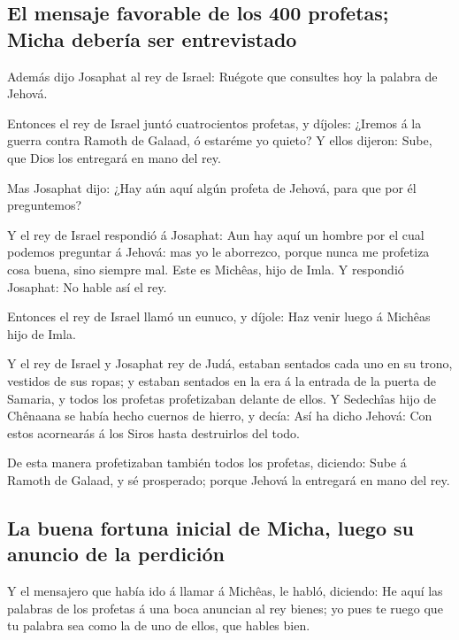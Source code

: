 \hypertarget{el-mensaje-favorable-de-los-400-profetas-micha-deberuxeda-ser-entrevistado}{%
\subsection{El mensaje favorable de los 400 profetas; Micha debería ser
entrevistado}\label{el-mensaje-favorable-de-los-400-profetas-micha-deberuxeda-ser-entrevistado}}

 Además dijo Josaphat al rey de Israel: Ruégote que
consultes hoy la palabra de Jehová.

 Entonces el rey de Israel juntó cuatrocientos profetas, y
díjoles: ¿Iremos á la guerra contra Ramoth de Galaad, ó estaréme yo
quieto? Y ellos dijeron: Sube, que Dios los entregará en mano del rey.

 Mas Josaphat dijo: ¿Hay aún aquí algún profeta de Jehová,
para que por él preguntemos?

 Y el rey de Israel respondió á Josaphat: Aun hay aquí un
hombre por el cual podemos preguntar á Jehová: mas yo le aborrezco,
porque nunca me profetiza cosa buena, sino siempre mal. Este es Michêas,
hijo de Imla. Y respondió Josaphat: No hable así el rey.

 Entonces el rey de Israel llamó un eunuco, y díjole: Haz
venir luego á Michêas hijo de Imla.

 Y el rey de Israel y Josaphat rey de Judá, estaban sentados
cada uno en su trono, vestidos de sus ropas; y estaban sentados en la
era á la entrada de la puerta de Samaria, y todos los profetas
profetizaban delante de ellos.  Y Sedechîas hijo de
Chênaana se había hecho cuernos de hierro, y decía: Así ha dicho Jehová:
Con estos acornearás á los Siros hasta destruirlos del todo.

 De esta manera profetizaban también todos los profetas,
diciendo: Sube á Ramoth de Galaad, y sé prosperado; porque Jehová la
entregará en mano del rey.

\hypertarget{la-buena-fortuna-inicial-de-micha-luego-su-anuncio-de-la-perdiciuxf3n}{%
\subsection{La buena fortuna inicial de Micha, luego su anuncio de la
perdición}\label{la-buena-fortuna-inicial-de-micha-luego-su-anuncio-de-la-perdiciuxf3n}}

 Y el mensajero que había ido á llamar á Michêas, le habló,
diciendo: He aquí las palabras de los profetas á una boca anuncian al
rey bienes; yo pues te ruego que tu palabra sea como la de uno de ellos,
que hables bien.

